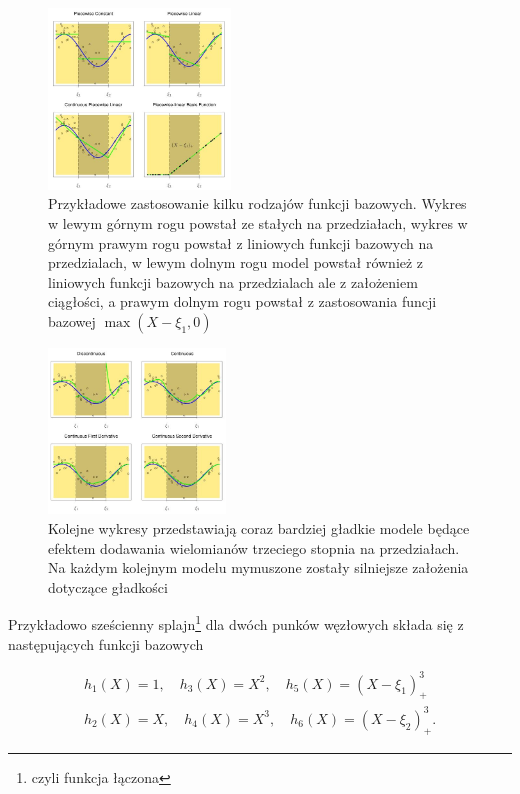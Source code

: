 \documentclass[
]{book}
\theoremstyle{plain}
\theoremstyle{definition}
\theoremstyle{definition}
\theoremstyle{definition}
\theoremstyle{definition}
\theoremstyle{remark}
\begin{document}
\begin{figure}

{\centering \includegraphics[width=1.91in]{images/spline1} 

}

\caption{Przykładowe zastosowanie kilku rodzajów funkcji bazowych. Wykres w lewym górnym rogu powstał ze stałych na przedziałach, wykres w górnym prawym rogu powstał z liniowych funkcji bazowych na przedzialach, w lewym dolnym rogu model powstał również z liniowych funkcji bazowych na przedzialach ale z założeniem ciągłości, a prawym dolnym rogu powstał z zastosowania funcji bazowej $\max(X-\xi_1,0)$}\label{fig:spline1}
\end{figure}

\begin{figure}

{\centering \includegraphics[width=1.85in]{images/spline2} 

}

\caption{Kolejne wykresy przedstawiają coraz bardziej gładkie modele będące efektem dodawania wielomianów trzeciego stopnia na przedziałach. Na każdym kolejnym modelu mymuszone zostały silniejsze założenia dotyczące gładkości}\label{fig:spline2}
\end{figure}

Przykładowo sześcienny splajn\footnote{czyli funkcja łączona} dla dwóch punków węzłowych składa się z następujących funkcji bazowych

\begin{gather}
    h_1(X)=1,\quad h_3(X)=X^2,\quad h_5(X)=(X-\xi_1)_+^3\\
    h_2(X)=X,\quad h_4(X)=X^3,\quad h_6(X)=(X-\xi_2)_+^3.
\end{gather}
\end{document}
